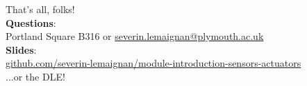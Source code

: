 \documentclass[compress]{beamer}
\makeatletter
\def\beamer@writeslidentry@miniframesoff{%
  \expandafter\beamer@ifempty\expandafter{\beamer@framestartpage}{}%
  {%
    \clearpage\beamer@notesactions%
  }
}
\newcommand*{\miniframesoff}{\let\beamer@writeslidentry=\beamer@writeslidentry@miniframesoff}
\makeatother
\begin{document}
%
%
%
%
%



\miniframesoff
\begin{frame}{}
    \begin{center}
        \Large
        That's all, folks!\\[2em]

        \normalsize
        \textbf{Questions}:\\
        Portland Square B316 or \url{severin.lemaignan@plymouth.ac.uk} \\[1em]

        \textbf{Slides}:\\
        \href{https://github.com/severin-lemaignan/module-introduction-sensors-actuators}{\small
        github.com/severin-lemaignan/module-introduction-sensors-actuators} \\

        ...or the DLE!


    \end{center}
\end{frame}
\end{document}
